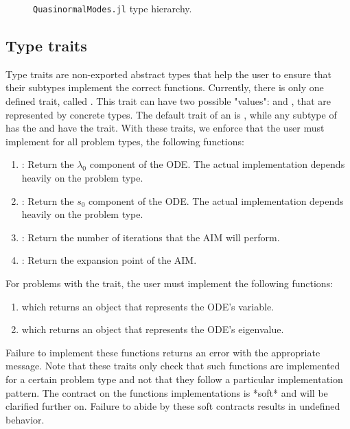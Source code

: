 \begin{figure}[!ht]
  \centering
  \fontsize{9}{10}\selectfont
  
  \caption{\texttt{QuasinormalModes.jl} type hierarchy.}
  \label{fig:type_hierarchy}
\end{figure}

\subsection{Type traits}

Type traits are non-exported abstract types that help the user to ensure that their subtypes implement the correct functions. Currently, there is only one defined trait, called . This trait can have two possible "values":  and , that are represented by concrete types. The default trait of an  is , while any subtype of  has the  and  have the  trait. With these traits, we enforce that the user must implement for all problem types, the following functions:
%
\begin{enumerate}
  \item {}: Return the $\lambda_0$ component of the ODE. The actual implementation depends heavily on the problem type.
  \item {}: Return the $s_0$ component of the ODE. The actual implementation depends heavily on the problem type.
  \item {}: Return the number of iterations that the AIM will perform.
  \item {}: Return the expansion point of the AIM.
\end{enumerate}
%
For problems with the  trait, the user must implement the following functions:
\begin{enumerate}
  \item {} which returns an object that represents the ODE's variable.
  \item {} which returns an object that represents the ODE's eigenvalue.
\end{enumerate}
%
Failure to implement these functions returns an error with the appropriate message. Note that these traits only check that such functions are implemented for a certain problem type and not that they follow a particular implementation pattern. The contract on the functions implementations is *soft* and will be clarified further on. Failure to abide by these soft contracts results in undefined behavior.

